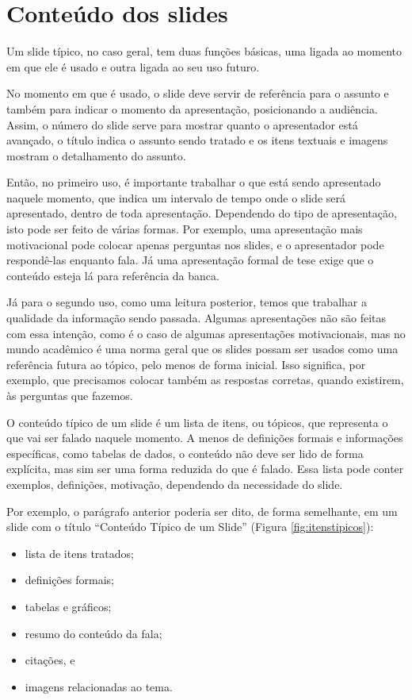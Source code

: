 \section{Conteúdo dos slides}

Um slide típico, no caso geral, tem duas funções básicas, uma ligada ao momento em que ele é usado e outra ligada ao seu uso futuro.

No momento em que é usado, o slide deve servir de referência para o assunto e também para indicar o momento da apresentação, posicionando a audiência. Assim, o número do slide serve para mostrar quanto o apresentador está avançado, o título indica o assunto sendo tratado e os itens textuais e imagens mostram o detalhamento do assunto.

Então, no primeiro uso, é importante trabalhar o que está sendo apresentado naquele momento, que indica um intervalo de tempo onde o slide será apresentado, dentro de toda apresentação. Dependendo do tipo de apresentação, isto pode ser feito de várias formas. Por exemplo, uma apresentação mais motivacional pode colocar apenas perguntas nos slides, e o apresentador pode respondê-las enquanto fala. Já uma apresentação formal de tese exige que o conteúdo esteja lá para referência da banca.

Já para o segundo uso, como uma leitura posterior, temos que trabalhar a qualidade da informação sendo passada. Algumas apresentações não são feitas com essa intenção, como é o caso de algumas apresentações motivacionais, mas no mundo acadêmico é uma norma geral que os slides possam ser usados como uma referência futura ao tópico, pelo menos de forma inicial. Isso significa, por exemplo, que precisamos colocar também as respostas corretas, quando existirem, às perguntas que fazemos.

O conteúdo típico de um slide é um lista de itens, ou tópicos,  que representa o que vai ser falado naquele momento. A menos de definições formais e informações específicas, como tabelas de dados, o conteúdo não deve ser lido de forma explícita, mas sim ser uma forma reduzida do que é falado.  Essa lista pode conter exemplos, definições, motivação, dependendo da necessidade do slide.

Por exemplo, o parágrafo anterior poderia ser dito, de forma semelhante, em um slide com o título ``Conteúdo Típico de um Slide'' (Figura \ref{fig:itenstipicos}):
\begin{itemize}
    \item lista de itens tratados;
    \item definições formais;
    \item tabelas e gráficos;
    \item resumo do conteúdo da fala;
    \item citações, e
    \item imagens relacionadas ao tema.
\end{itemize}

